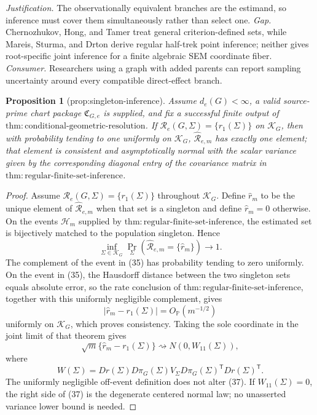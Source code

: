 \documentclass{article}
\newtheorem{proposition}{Proposition}
\begin{document}
\par\smallskip\noindent \textit{Justification.} The observationally equivalent branches are the estimand, so inference must cover them simultaneously rather than select one. \textit{Gap.} Chernozhukov, Hong, and Tamer treat general criterion-defined sets, while Mareis, Sturma, and Drton derive regular half-trek point inference; neither gives root-specific joint inference for a finite algebraic SEM coordinate fiber. \textit{Consumer.} Researchers using a graph with added parents can report sampling uncertainty around every compatible direct-effect branch.

\begin{proposition}[prop:singleton-inference]\label{prop:singleton-inference}
Assume \(d_e(G)<\infty\), a valid source-prime chart package \(\mathfrak C_{G,e}\) is supplied, and fix a successful finite output of \(\mathrm{thm:conditional\mbox{-}geometric\mbox{-}resolution}\). If \(\mathcal R_e(G,\Sigma)=\{r_1(\Sigma)\}\) on \(\mathcal K_G\), then with probability tending to one uniformly on \(\mathcal K_G\), \(\widehat{\mathcal R}_{e,m}\) has exactly one element; that element is consistent and asymptotically normal with the scalar variance given by the corresponding diagonal entry of the covariance matrix in \(\mathrm{thm:regular\mbox{-}finite\mbox{-}set\mbox{-}inference}\).
\end{proposition}
\begin{proof}
Assume \(\mathcal R_e(G,\Sigma)=\{r_1(\Sigma)\}\) throughout \(\mathcal K_G\).  Define \(\widehat r_m\) to be the unique element of \(\widehat{\mathcal R}_{e,m}\) when that set is a singleton and define \(\widehat r_m=0\) otherwise.  On the events \(\mathcal H_m\) supplied by \(\mathrm{thm:regular\mbox{-}finite\mbox{-}set\mbox{-}inference}\), the estimated set is bijectively matched to the population singleton.  Hence
\[
 \inf_{\Sigma\in\mathcal K_G}
 \Pr_\Sigma\!\left(\widehat{\mathcal R}_{e,m}=\{\widehat r_m\}\right)
 \longrightarrow1.
\tag{35}
\]
The complement of the event in (35) has probability tending to zero uniformly.  On the event in (35), the Hausdorff distance between the two singleton sets equals absolute error, so the rate conclusion of \(\mathrm{thm:regular\mbox{-}finite\mbox{-}set\mbox{-}inference}\), together with this uniformly negligible complement, gives
\[
 |\widehat r_m-r_1(\Sigma)|=O_{\mathbb P}(m^{-1/2})
\tag{36}
\]
uniformly on \(\mathcal K_G\), which proves consistency.  Taking the sole coordinate in the joint limit of that theorem gives
\[
 \sqrt m\{\widehat r_m-r_1(\Sigma)\}
 \rightsquigarrow N(0,W_{11}(\Sigma)),
\tag{37}
\]
where
\[
 W(\Sigma)
 =Dr(\Sigma)D\pi_G(\Sigma)V_\Sigma
 D\pi_G(\Sigma)^{\mathsf T}Dr(\Sigma)^{\mathsf T}.
\tag{38}
\]
The uniformly negligible off-event definition does not alter (37).  If \(W_{11}(\Sigma)=0\), the right side of (37) is the degenerate centered normal law; no unasserted variance lower bound is needed.
\end{proof}
\end{document}
